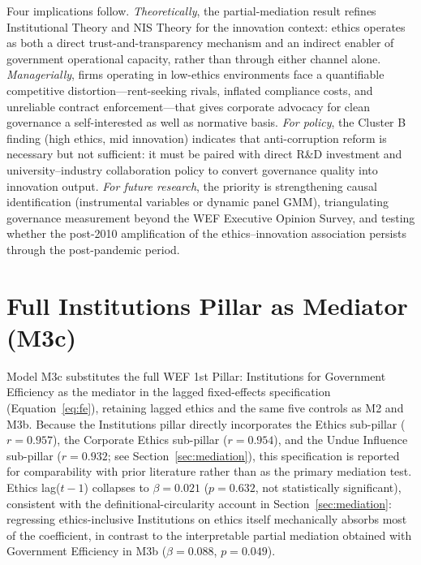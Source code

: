 \documentclass[pdflatex,sn-apa]{sn-jnl}
\begin{document}
Four implications follow. \textit{Theoretically}, the partial-mediation result refines Institutional Theory and NIS Theory for the innovation context: ethics operates as both a direct trust-and-transparency mechanism and an indirect enabler of government operational capacity, rather than through either channel alone. \textit{Managerially}, firms operating in low-ethics environments face a quantifiable competitive distortion---rent-seeking rivals, inflated compliance costs, and unreliable contract enforcement---that gives corporate advocacy for clean governance a self-interested as well as normative basis. \textit{For policy}, the Cluster B finding (high ethics, mid innovation) indicates that anti-corruption reform is necessary but not sufficient: it must be paired with direct R\&D investment and university--industry collaboration policy to convert governance quality into innovation output. \textit{For future research}, the priority is strengthening causal identification (instrumental variables or dynamic panel GMM), triangulating governance measurement beyond the WEF Executive Opinion Survey, and testing whether the post-2010 amplification of the ethics--innovation association persists through the post-pandemic period.




\clearpage
\appendix

\section{Full Institutions Pillar as Mediator (M3c)}
\label{app:appendixA}

Model M3c substitutes the full WEF 1st Pillar: Institutions for Government Efficiency as the mediator in the lagged fixed-effects specification (Equation~\ref{eq:fe}), retaining lagged ethics and the same five controls as M2 and M3b. Because the Institutions pillar directly incorporates the Ethics sub-pillar ($r=0.957$), the Corporate Ethics sub-pillar ($r=0.954$), and the Undue Influence sub-pillar ($r=0.932$; see Section~\ref{sec:mediation}), this specification is reported for comparability with prior literature rather than as the primary mediation test. Ethics lag($t-1$) collapses to $\beta=0.021$ ($p=0.632$, not statistically significant), consistent with the definitional-circularity account in Section~\ref{sec:mediation}: regressing ethics-inclusive Institutions on ethics itself mechanically absorbs most of the coefficient, in contrast to the interpretable partial mediation obtained with Government Efficiency in M3b ($\beta=0.088$, $p=0.049$).
\end{document}

